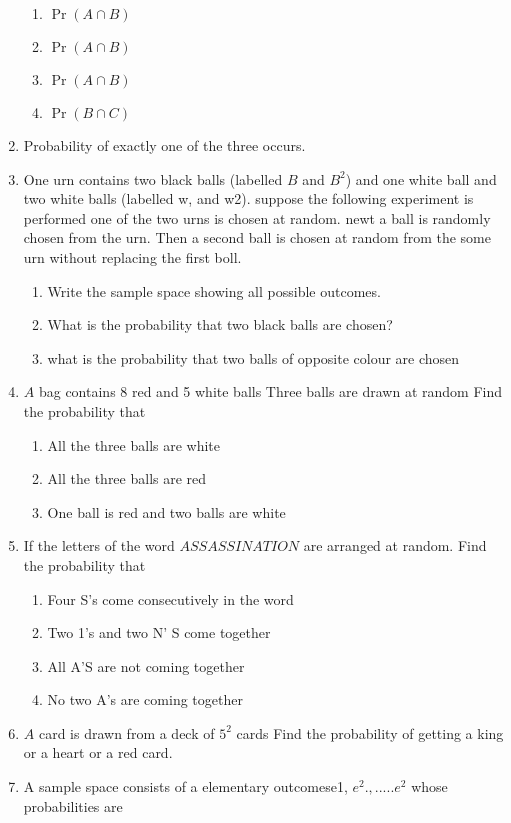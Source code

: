 \documentclass[12pt]{article}
\providecommand{\pr}[1]{\ensuremath{\Pr\left(#1\right)}}
\begin{document}
\begin{enumerate}
\begin{enumerate}
\item $\pr{A\cap B}$
\item $\pr{A\cap B}$
\item $\pr{A\cap B}$
\item $\pr{B\cap C}$
\end{enumerate}
\item Probability of exactly one of the three occurs.
\item One urn contains two black balls (labelled $B$ and $B^2$) and one white ball and two white balls (labelled w, and w2). suppose the following experiment is performed one of the two urns is chosen at random. newt a ball is randomly chosen from the urn. Then a second ball is chosen at random from the some urn without replacing the first boll.
	\begin{enumerate}
\item Write the sample space showing all possible outcomes.
\item What is the probability that two black balls are chosen?
\item what is the probability that two balls of opposite colour are chosen
	\end{enumerate}
\item $A$ bag contains 8 red and 5 white balls Three balls are drawn at random Find the probability that
	\begin{enumerate}
\item All the three balls are white\item All the three balls are red
\item One ball is red and two balls are white
	\end{enumerate}
\item If the letters of the word $ASSASSINATION$ are arranged at random. Find the probability that
	\begin{enumerate}
\item Four S's come consecutively in the word
\item Two 1's and two N' S  come together
\item All A'S are not coming together
\item No two A's are coming together
	\end{enumerate}
\item $A$ card is drawn from a deck of $5^2$ cards Find the probability of getting a king or a heart or a red card.
\item A sample space consists of a elementary outcomese1, $e^2.,.....e^2$ whose probabilities are
	\begin{align}

\end{align}
\end{enumerate}
\end{document}
